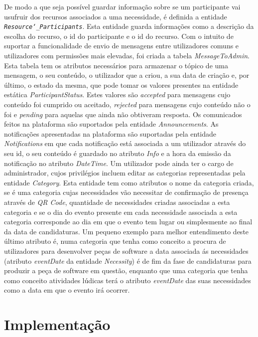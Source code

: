 De modo a que seja possível guardar informação sobre se um participante vai usufruir dos recursos associados a uma necessidade, é definida a entidade \texttt{\textit{Resource\char`_Participants}}.
Esta entidade guarda informações como a descrição da escolha do recurso, o id do participante e o id do recurso.
Com o intuito de suportar a funcionalidade de envio de mensagens entre utilizadores comuns e utilizadores com permissões mais elevadas, foi criada a tabela \textit{MessageToAdmin}. 
Esta tabela tem os atributos necessários para armazenar o tópico de uma mensagem, o seu conteúdo, o utilizador que a criou, a sua data de criação e, por último, o estado da mesma, que pode tomar os valores presentes na entidade estática \textit{ParticipantStatus}. 
Estes valores são \textit{accepted} para mensagens cujo conteúdo foi cumprido ou aceitado, \textit{rejected} para mensagens cujo conteúdo não o foi e \textit{pending} para aquelas que ainda não obtiveram resposta.
Os comunicados feitos na plataforma são suportados pela entidade \textit{Announcements}. As notificações apresentadas na plataforma são suportadas pela entidade \textit{Notifications} em que cada notificação está associada a um utilizador através do seu id, o seu conteúdo é guardado no atributo \textit{Info} e a hora da emissão da notificação no atributo \textit{DateTime}. 
Um utilizador pode ainda ter o cargo de administrador, cujos privilégios incluem editar as categorias representadas pela entidade \textit{Category}. Esta entidade tem como atributos o nome da categoria criada, se é uma categoria cujas necessidades vão necessitar de confirmação de presença através de \textit{QR Code}, quantidade de necessidades criadas associadas a esta categoria e se o dia do evento presente em cada necessidade associada a esta categoria corresponde ao dia em que o evento tem lugar ou simplesmente ao final da data de candidaturas. 
Um pequeno exemplo para melhor entendimento deste último atributo é, numa categoria que tenha como conceito a procura de utilizadores para desenvolver peças de software a data associada ás necessidades (atributo \textit{eventDate} da entidade \textit{Necessity}) é de fim da fase de candidaturas para produzir a peça de software em questão, enquanto que uma categoria que tenha como conceito atividades lúdicas terá o atributo \textit{eventDate} das suas necessidades como a data em que o evento irá ocorrer.

\section{Implementação}\label{sec:implementacao}

